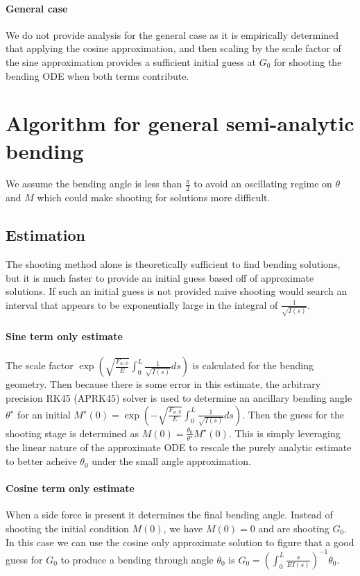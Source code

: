 \documentclass[12pt,reqno]{article}
\begin{document}
	\paragraph{General case}
	We do not provide analysis for the general case as it is empirically determined that applying the cosine approximation, and then scaling by the scale factor of the sine approximation provides a sufficient initial guess at $G_{0}$ for shooting the bending ODE when both terms contribute.
	
	\section{Algorithm for general semi-analytic bending}
	We assume the bending angle is less than $\frac{\pi}{2}$ to avoid an oscillating regime on $\theta$ and $M$ which could make shooting for solutions more difficult.
	\subsection{Estimation}
	The shooting method alone is theoretically sufficient to find bending solutions, but it is much faster to provide an initial guess based off of approximate solutions. If such an initial guess is not provided naive shooting would search an interval that appears to be exponentially large in the integral of $\frac{1}{\sqrt{I(s)}}$.
	
	\paragraph{Sine term only estimate}
	The scale factor $\exp({\sqrt{\frac{F_{w,0}}{E}}}\int_{0}^{L}\frac{1}{\sqrt{I(s)}}ds)$ is calculated for the bending geometry. Then because there is some error in this estimate, the arbitrary precision RK45 (APRK45) solver is used to determine an ancillary bending angle $\theta^{\star}$ for an initial $M^{\star}(0) = \exp(-{\sqrt{\frac{F_{w,0}}{E}}}\int_{0}^{L}\frac{1}{\sqrt{I(s)}}ds)$. Then the guess for the shooting stage is determined as $M(0) = \frac{\theta_{0}}{\theta^{\star}} M^{\star}(0)$. This is simply leveraging the linear nature of the approximate ODE to rescale the purely analytic estimate to better acheive $\theta_{0}$ under the small angle approximation.
	
	\paragraph{Cosine term only estimate}
	When a side force is present it determines the final bending angle. Instead of shooting the initial condition $M(0)$, we have $M(0) = 0$ and are shooting $G_{0}$. In this case we can use the cosine only approximate solution to figure that a good guess for $G_{0}$ to produce a bending through angle $\theta_{0}$ is $G_{0} =(\int_{0}^{L}\frac{s}{EI(s)})^{-1} \theta_{0} $.
	
\end{document}
